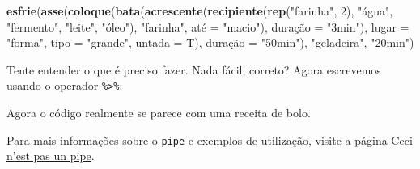 \documentclass[]{book}
\newenvironment{Shaded}{\begin{snugshade}}{\end{snugshade}}
\newcommand{\KeywordTok}[1]{\textcolor[rgb]{0.13,0.29,0.53}{\textbf{{#1}}}}
\newcommand{\DataTypeTok}[1]{\textcolor[rgb]{0.13,0.29,0.53}{{#1}}}
\newcommand{\DecValTok}[1]{\textcolor[rgb]{0.00,0.00,0.81}{{#1}}}
\newcommand{\StringTok}[1]{\textcolor[rgb]{0.31,0.60,0.02}{{#1}}}
\newcommand{\NormalTok}[1]{{#1}}
\begin{document}
\begin{Shaded}
\begin{Highlighting}[]
\KeywordTok{esfrie}\NormalTok{(}\KeywordTok{asse}\NormalTok{(}\KeywordTok{coloque}\NormalTok{(}\KeywordTok{bata}\NormalTok{(}\KeywordTok{acrescente}\NormalTok{(}\KeywordTok{recipiente}\NormalTok{(}\KeywordTok{rep}\NormalTok{(}\StringTok{"farinha"}\NormalTok{, }\DecValTok{2}\NormalTok{), }\StringTok{"água"}\NormalTok{, }\StringTok{"fermento"}\NormalTok{, }\StringTok{"leite"}\NormalTok{, }\StringTok{"óleo"}\NormalTok{), }\StringTok{"farinha"}\NormalTok{, até =}\StringTok{ "macio"}\NormalTok{), duraçã}\DataTypeTok{o =} \StringTok{"3min"}\NormalTok{), }\DataTypeTok{lugar =} \StringTok{"forma"}\NormalTok{, }\DataTypeTok{tipo =} \StringTok{"grande"}\NormalTok{, }\DataTypeTok{untada =} \NormalTok{T), duraçã}\DataTypeTok{o =} \StringTok{"50min"}\NormalTok{), }\StringTok{"geladeira"}\NormalTok{, }\StringTok{"20min"}\NormalTok{)}
\end{Highlighting}
\end{Shaded}

Tente entender o que é preciso fazer. Nada fácil, correto? Agora
escrevemos usando o operador \texttt{\%\textgreater{}\%}:

\begin{Shaded}
\end{Shaded}

Agora o código realmente se parece com uma receita de bolo.

Para mais informações sobre o \texttt{pipe} e exemplos de utilização,
visite a página
\href{http://cran.r-project.org/web/packages/magrittr/vignettes/magrittr.html}{Ceci
n'est pas un pipe}.
\end{document}
